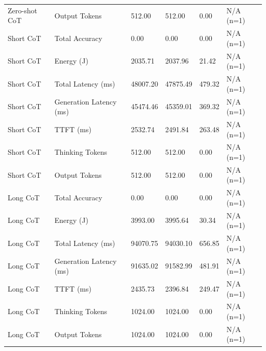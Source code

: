 \begin{table}
\begin{tabular}{llllll}
Zero-shot CoT & Output Tokens & 512.00 & 512.00 & 0.00 & N/A (n=1) \\
Short CoT & Total Accuracy & 0.00 & 0.00 & 0.00 & N/A (n=1) \\
Short CoT & Energy (J) & 2035.71 & 2037.96 & 21.42 & N/A (n=1) \\
Short CoT & Total Latency (ms) & 48007.20 & 47875.49 & 479.32 & N/A (n=1) \\
Short CoT & Generation Latency (ms) & 45474.46 & 45359.01 & 369.32 & N/A (n=1) \\
Short CoT & TTFT (ms) & 2532.74 & 2491.84 & 263.48 & N/A (n=1) \\
Short CoT & Thinking Tokens & 512.00 & 512.00 & 0.00 & N/A (n=1) \\
Short CoT & Output Tokens & 512.00 & 512.00 & 0.00 & N/A (n=1) \\
Long CoT & Total Accuracy & 0.00 & 0.00 & 0.00 & N/A (n=1) \\
Long CoT & Energy (J) & 3993.00 & 3995.64 & 30.34 & N/A (n=1) \\
Long CoT & Total Latency (ms) & 94070.75 & 94030.10 & 656.85 & N/A (n=1) \\
Long CoT & Generation Latency (ms) & 91635.02 & 91582.99 & 481.91 & N/A (n=1) \\
Long CoT & TTFT (ms) & 2435.73 & 2396.84 & 249.47 & N/A (n=1) \\
Long CoT & Thinking Tokens & 1024.00 & 1024.00 & 0.00 & N/A (n=1) \\
Long CoT & Output Tokens & 1024.00 & 1024.00 & 0.00 & N/A (n=1) \\
\bottomrule
\end{tabular}
\end{table}
